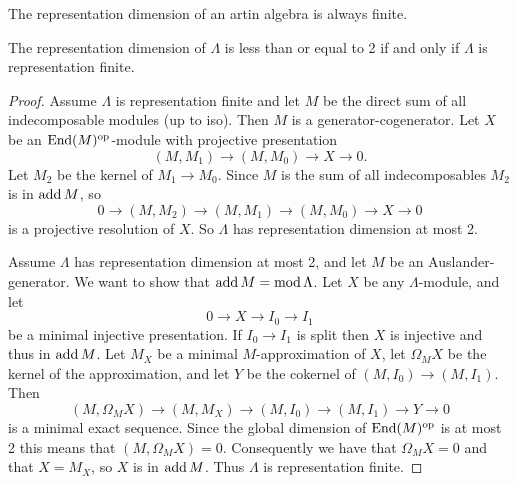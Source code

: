 \begin{prop}
	The representation dimension of an artin algebra is always finite. \cite{Iya02}
\end{prop}

\begin{theorem}
	The representation dimension of $\Lambda$ is less than or equal to 2 if and only if $\Lambda$ is representation finite.
	\begin{proof}
		Assume $\Lambda$ is representation finite and let $M$ be the direct sum of all indecomposable modules (up to iso). Then $M$ is a generator-cogenerator. Let $X$ be an $\operatorname{End}(M)^{\operatorname{op}}$-module with projective presentation 
		$$(M,M_1) \to (M, M_0) \to X \to 0.$$ 
		Let $M_2$ be the kernel of $M_1 \to M_0$. Since $M$ is the sum of all indecomposables $M_2$ is in $\operatorname{add} M$, so 
		$$0 \to (M, M_2) \to (M,M_1) \to (M, M_0) \to X \to 0$$ 
		is a projective resolution of $X$. So $\Lambda$ has representation dimension at most 2.
		
		Assume $\Lambda$ has representation dimension at most 2, and let $M$ be an Auslander-generator. We want to show that $\operatorname{add} M = \operatorname{mod}\Lambda$. Let $X$ be any $\Lambda$-module, and let $$0 \to X \to I_0 \to I_1$$ be a minimal injective presentation. If $I_0 \to I_1$ is split then $X$ is injective and thus in $\operatorname{add} M$. Let $M_X$ be a minimal $M$-approximation of $X$, let $\Omega_M X$ be the kernel of the approximation, and let $Y$ be the cokernel of $(M, I_0) \to (M, I_1)$. Then $$(M,\Omega_M X) \to (M,M_X) \to (M, I_0) \to (M, I_1) \to Y \to 0$$ is a minimal exact sequence. Since the global dimension of $\operatorname{End}(M)^{\operatorname{op}}$ is at most 2 this means that $(M, \Omega_M X)=0$. Consequently we have that $\Omega_M X = 0$ and that $X=M_X$, so $X$ is in $\operatorname{add} M$. Thus $\Lambda$ is representation finite.
	\end{proof}
\end{theorem}

